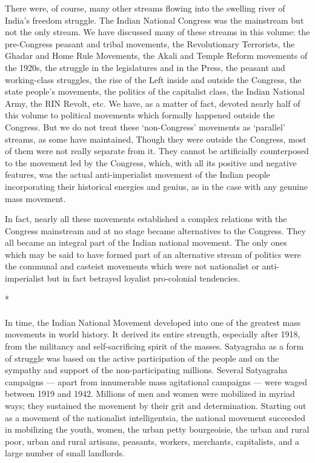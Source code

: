 There were, of course, many other streams flowing into the swelling river of India's freedom struggle. The Indian National Congress was the mainstream but not the only stream. We have discussed many of these streams in this volume: the pre-Congress peasant and tribal movements, the Revolutionary Terrorists, the Ghadar and Home Rule Movements, the Akali and Temple Reform movements of the 1920s, the struggle in the legislatures and in the Press, the peasant and working-class struggles, the rise of the Left inside and outside the Congress, the state people's movements, the politics of the capitalist class, the Indian National Army, the RIN Revolt, etc. We have, as a matter of fact, devoted nearly half of this volume to political movements which formally happened outside the Congress. But we do not treat these `non-Congress' movements as `parallel' streams, as some have maintained, Though they were outside the Congress, most of them were not really separate from it. They cannot be artificially counterposed to the movement led by the Congress, which, with all its positive and negative features, was the actual anti-imperialist movement of the Indian people incorporating their historical energies and genius, as in the case with any genuine mass movement.

In fact, nearly all these movements established a complex relations with the Congress mainstream and at no stage became alternatives to the Congress. They all became an integral part of the Indian national movement. The only ones which may be said to have formed part of an alternative stream of politics were the communal and casteist movements which were not nationalist or anti-imperialist but in fact betrayed loyalist pro-colonial tendencies.

\begin{center}*\end{center}

\paragraph*{}
In time, the Indian National Movement developed into one of the greatest mass movements in world history. It derived its entire strength, especially after 1918, from the militancy and self-sacrificing spirit of the masses. Satyagraha as a form of struggle was based on the active participation of the people and on the sympathy and support of the non-participating millions. Several Satyagraha campaigns — apart from innumerable mass agitational campaigns — were waged between 1919 and 1942. Millions of men and women were mobilized in myriad ways; they sustained the movement by their grit and determination. Starting out as a movement of the nationalist intelligentsia, the national movement succeeded in mobilizing the youth, women, the urban petty bourgeoisie, the urban and rural poor, urban and rural artisans, peasants, workers, merchants, capitalists, and a large number of small landlords.

